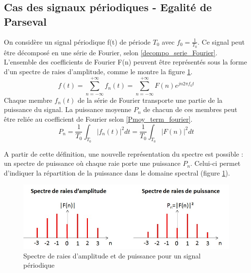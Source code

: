 	
	
	\subsection{Cas des signaux périodiques - Egalité de Parseval}
	On considère un signal périodique f(t) de période $T_{0}$ avec $f_{0}=\frac{1}{T_{0}}$. Ce signal peut être décomposé en une série de Fourier, selon \ref{decompo_serie_Fourier}. L'ensemble des coefficients de Fourier F(n) peuvent être représentés sous la forme d'un spectre de raies d'amplitude, comme le montre la figure \ref{Fig:spectre_raies_ampl_puissance}.
	\begin{equation}\label{decompo_serie_Fourier}
	f(t)=\sum_{n=-\infty}^{+\infty}f_{n}(t)=\sum_{n=-\infty}^{+\infty}F(n)e^{jn2\pi f_{0}t}
	\end{equation}
	Chaque membre $f_{n}(t)$ de la série de Fourier transporte une partie de la puissance du signal. La puissance moyenne $P_{n}$ de chacun de ces membres peut être reliée au coefficient de Fourier selon \ref{Pmoy_term_fourier}.
	\begin{equation}\label{Pmoy_term_fourier}
	P_{n}=\frac{1}{T_{0}}\int_{T_{0}}|f_{n}(t)|^{2}dt=\frac{1}{T_{0}}\int_{T_{0}}|F(n)|^{2}dt
	\end{equation}
	
	A partir de cette définition, une nouvelle représentation du spectre est possible : un spectre de puissance où chaque raie porte une puissance $P_{n}$. Celui-ci permet d'indiquer la répartition de la puissance dans le domaine spectral (figure \ref{Fig:spectre_raies_ampl_puissance}).
	
	\begin{figure}[h!]
		\centering
		\includegraphics[scale=0.6]{images/spectre_raies_ampl_puissance.jpg}
		\caption{Spectre de raies d'amplitude et de puissance pour un signal périodique}	
		\label{Fig:spectre_raies_ampl_puissance} 
	\end{figure}

